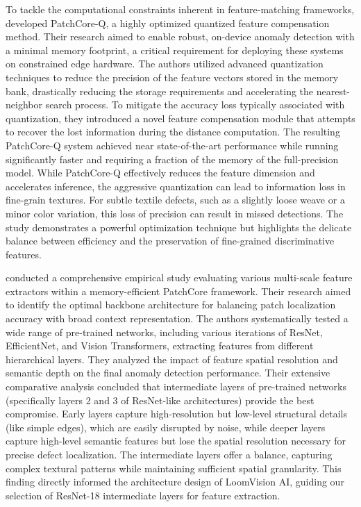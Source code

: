 \documentclass{ieeeaccess}
\begin{document}
To tackle the computational constraints inherent in feature-matching frameworks, \cite{b15} developed PatchCore-Q, a highly optimized quantized feature compensation method. Their research aimed to enable robust, on-device anomaly detection with a minimal memory footprint, a critical requirement for deploying these systems on constrained edge hardware. The authors utilized advanced quantization techniques to reduce the precision of the feature vectors stored in the memory bank, drastically reducing the storage requirements and accelerating the nearest-neighbor search process. To mitigate the accuracy loss typically associated with quantization, they introduced a novel feature compensation module that attempts to recover the lost information during the distance computation. The resulting PatchCore-Q system achieved near state-of-the-art performance while running significantly faster and requiring a fraction of the memory of the full-precision model. While PatchCore-Q effectively reduces the feature dimension and accelerates inference, the aggressive quantization can lead to information loss in fine-grain textures. For subtle textile defects, such as a slightly loose weave or a minor color variation, this loss of precision can result in missed detections. The study demonstrates a powerful optimization technique but highlights the delicate balance between efficiency and the preservation of fine-grained discriminative features.

\cite{b16} conducted a comprehensive empirical study evaluating various multi-scale feature extractors within a memory-efficient PatchCore framework. Their research aimed to identify the optimal backbone architecture for balancing patch localization accuracy with broad context representation. The authors systematically tested a wide range of pre-trained networks, including various iterations of ResNet, EfficientNet, and Vision Transformers, extracting features from different hierarchical layers. They analyzed the impact of feature spatial resolution and semantic depth on the final anomaly detection performance. Their extensive comparative analysis concluded that intermediate layers of pre-trained networks (specifically layers 2 and 3 of ResNet-like architectures) provide the best compromise. Early layers capture high-resolution but low-level structural details (like simple edges), which are easily disrupted by noise, while deeper layers capture high-level semantic features but lose the spatial resolution necessary for precise defect localization. The intermediate layers offer a balance, capturing complex textural patterns while maintaining sufficient spatial granularity. This finding directly informed the architecture design of LoomVision AI, guiding our selection of ResNet-18 intermediate layers for feature extraction.
\end{document}
